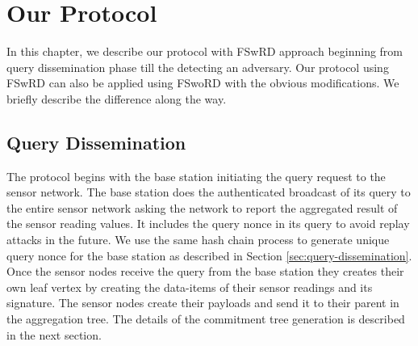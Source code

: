 \chapter{Our Protocol}
	In this chapter, we describe our protocol with FSwRD approach beginning from query dissemination phase till the detecting an adversary.
	Our protocol using FSwRD can also be applied using FSwoRD with the obvious modifications. 
	We briefly describe the difference along the way.


\section{Query Dissemination}
	The protocol begins with the base station initiating the query request to the sensor network.
	The base station does the authenticated broadcast of its query to the entire sensor network asking the network to report the aggregated result of the sensor reading values.
	It includes the query nonce in its query to avoid replay attacks in the future. 
	We use the same hash chain process to generate unique query nonce for the base station as described in Section \ref{sec:query-dissemination}.
	Once the sensor nodes receive the query from the base station they creates their own leaf vertex by creating the data-items of their sensor readings and its signature.
	The sensor nodes create their payloads and send it to their parent in the aggregation tree. 
	The details of the commitment tree generation is described in the next section.

